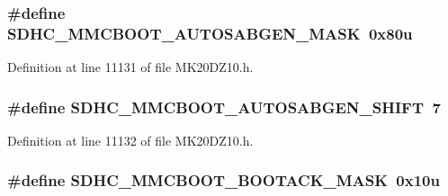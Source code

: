 \subsubsection[{\texorpdfstring{S\+D\+H\+C\+\_\+\+M\+M\+C\+B\+O\+O\+T\+\_\+\+A\+U\+T\+O\+S\+A\+B\+G\+E\+N\+\_\+\+M\+A\+SK}{SDHC_MMCBOOT_AUTOSABGEN_MASK}}]{\setlength{\rightskip}{0pt plus 5cm}\#define S\+D\+H\+C\+\_\+\+M\+M\+C\+B\+O\+O\+T\+\_\+\+A\+U\+T\+O\+S\+A\+B\+G\+E\+N\+\_\+\+M\+A\+SK~0x80u}\hypertarget{group___s_d_h_c___register___masks_gaf80857b20ac681cf157b8012b2cbaaa3}{}\label{group___s_d_h_c___register___masks_gaf80857b20ac681cf157b8012b2cbaaa3}


Definition at line 11131 of file M\+K20\+D\+Z10.\+h.

\subsubsection[{\texorpdfstring{S\+D\+H\+C\+\_\+\+M\+M\+C\+B\+O\+O\+T\+\_\+\+A\+U\+T\+O\+S\+A\+B\+G\+E\+N\+\_\+\+S\+H\+I\+FT}{SDHC_MMCBOOT_AUTOSABGEN_SHIFT}}]{\setlength{\rightskip}{0pt plus 5cm}\#define S\+D\+H\+C\+\_\+\+M\+M\+C\+B\+O\+O\+T\+\_\+\+A\+U\+T\+O\+S\+A\+B\+G\+E\+N\+\_\+\+S\+H\+I\+FT~7}\hypertarget{group___s_d_h_c___register___masks_ga2115330345a0a216c1d1721e84b32ea2}{}\label{group___s_d_h_c___register___masks_ga2115330345a0a216c1d1721e84b32ea2}


Definition at line 11132 of file M\+K20\+D\+Z10.\+h.

\subsubsection[{\texorpdfstring{S\+D\+H\+C\+\_\+\+M\+M\+C\+B\+O\+O\+T\+\_\+\+B\+O\+O\+T\+A\+C\+K\+\_\+\+M\+A\+SK}{SDHC_MMCBOOT_BOOTACK_MASK}}]{\setlength{\rightskip}{0pt plus 5cm}\#define S\+D\+H\+C\+\_\+\+M\+M\+C\+B\+O\+O\+T\+\_\+\+B\+O\+O\+T\+A\+C\+K\+\_\+\+M\+A\+SK~0x10u}\hypertarget{group___s_d_h_c___register___masks_ga878fce0feabab8806e311871a08386c9}{}\label{group___s_d_h_c___register___masks_ga878fce0feabab8806e311871a08386c9}


